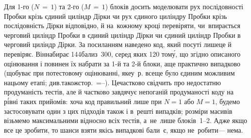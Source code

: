 \Tutorial
Для \mbox{1-го} (${N\,{=}\,1}$) та \mbox{2-го} (${M\,{=}\,1}$) блоків досить моделювати рух послідовності Пробки крізь єдиний циліндр Дірки чи рух єдиного циліндру Пробки крізь послідовність Дірки відповідно, й на~кожному кроці перевіряти, чи~впирається черговий циліндр Пробки в єдиний циліндр Дірки чи єдиний циліндр Пробки в черговий циліндр Дірки. За посиланням 
наведено код, який по\nolinebreak[2] суті лише\nolinebreak[2] це й перевіряє. Він\nolinebreak[2] набирає 144\nolinebreak[3] бали\nolinebreak[2] з~300, серед яких 120 том\'{у}, що згідно описаного оцінювання і повинен їх набрати за \mbox{1-й} та \mbox{2-й} блоки, а\nolinebreak[3] ще практично випадково (що\nolinebreak[3] буває при потестовому оцінюванні, яке\nolinebreak[2] у~р. все\nolinebreak[3] ще було єдиним можливим на\nolinebreak[3] цьому етапі; див.\nolinebreak[3] також\nolinebreak[2] стор.~\mbox{\pageref{text:about-by-test-and-by-block-scoring-start}\ifnum{}=\else--\pageref{text:about-by-test-and-by-block-scoring-finish}\fi}). Це\nolinebreak[3] частково свідчить про недостатню продуманість тестів, але й частково завдячує непоганій продуманості коду на р\'{і}вні таких прийомів: хоча код правильний лише при $N{=}1$ або $M{=}1$, будемо застосовувати один з цих підходів також і в~решті випадків; розміри масивів візьмемо максимальними відносно всіх тестів, а~не~лише блоків~\mbox{1--2}.\label{text:dump-and-hole-partial-solution-1-2} Адже якщо все це зробити, то шанси взяти якісь випадкові бали~є, якщо не~робити\nolinebreak[3] --- нема.

